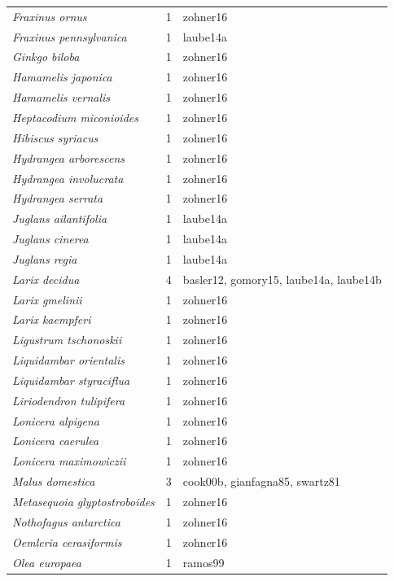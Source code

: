 \documentclass{article}
\begin{document}
\begin{footnotesize}
\begin{longtable}{p{}p{}p{}}
  \textit{Fraxinus ornus} &   1 & zohner16 \\ 
  \textit{Fraxinus pennsylvanica} &   1 & laube14a \\ 
  \textit{Ginkgo biloba} &   1 & zohner16 \\ 
  \textit{Hamamelis japonica} &   1 & zohner16 \\ 
  \textit{Hamamelis vernalis} &   1 & zohner16 \\ 
  \textit{Heptacodium miconioides} &   1 & zohner16 \\ 
  \textit{Hibiscus syriacus} &   1 & zohner16 \\ 
  \textit{Hydrangea arborescens} &   1 & zohner16 \\ 
  \textit{Hydrangea involucrata} &   1 & zohner16 \\ 
  \textit{Hydrangea serrata} &   1 & zohner16 \\ 
  \textit{Juglans ailantifolia} &   1 & laube14a \\ 
  \textit{Juglans cinerea} &   1 & laube14a \\ 
  \textit{Juglans regia} &   1 & laube14a \\ 
  \textit{Larix decidua} &   4 & basler12, gomory15, laube14a, laube14b \\ 
  \textit{Larix gmelinii} &   1 & zohner16 \\ 
  \textit{Larix kaempferi} &   1 & zohner16 \\ 
  \textit{Ligustrum tschonoskii} &   1 & zohner16 \\ 
  \textit{Liquidambar orientalis} &   1 & zohner16 \\ 
  \textit{Liquidambar styraciflua} &   1 & zohner16 \\ 
  \textit{Liriodendron tulipifera} &   1 & zohner16 \\ 
  \textit{Lonicera alpigena} &   1 & zohner16 \\ 
  \textit{Lonicera caerulea} &   1 & zohner16 \\ 
  \textit{Lonicera maximowiczii} &   1 & zohner16 \\ 
  \textit{Malus domestica} &   3 & cook00b, gianfagna85, swartz81 \\ 
  \textit{Metasequoia glyptostroboides} &   1 & zohner16 \\ 
  \textit{Nothofagus antarctica} &   1 & zohner16 \\ 
  \textit{Oemleria cerasiformis} &   1 & zohner16 \\ 
  \textit{Olea europaea} &   1 & ramos99 \\ 

\end{longtable}
\end{footnotesize}
\end{document}
